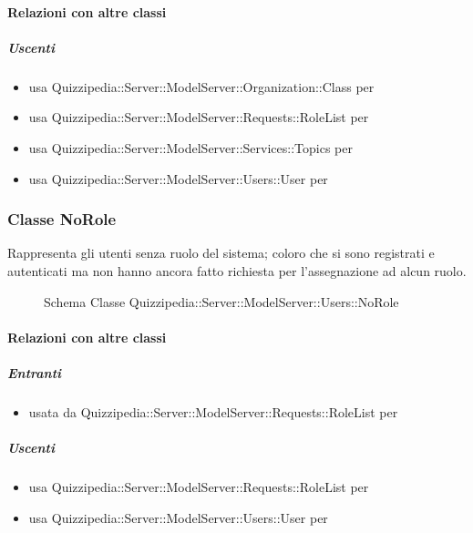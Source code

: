 \paragraph{Relazioni con altre classi}
\subparagraph{Uscenti}
\begin{itemize}
\item usa Quizzipedia::Server::ModelServer::Organization::Class per 
\item usa Quizzipedia::Server::ModelServer::Requests::RoleList per 
\item usa Quizzipedia::Server::ModelServer::Services::Topics per 
\item usa Quizzipedia::Server::ModelServer::Users::User per 
\end{itemize}
\subsubsection{Classe NoRole}
Rappresenta gli utenti senza ruolo del sistema; coloro che si sono registrati e autenticati ma non hanno ancora fatto richiesta per l'assegnazione ad alcun ruolo.
\begin{figure}[H]
\centering
\noindent{}
\caption[Schema Classe NoRole]{Schema Classe Quizzipedia::Server::ModelServer::Users::NoRole}
\end{figure}
\paragraph{Relazioni con altre classi}
\subparagraph{Entranti}
\begin{itemize}
\item usata da Quizzipedia::Server::ModelServer::Requests::RoleList per 
\end{itemize}
\subparagraph{Uscenti}
\begin{itemize}
\item usa Quizzipedia::Server::ModelServer::Requests::RoleList per 
\item usa Quizzipedia::Server::ModelServer::Users::User per 
\end{itemize}
